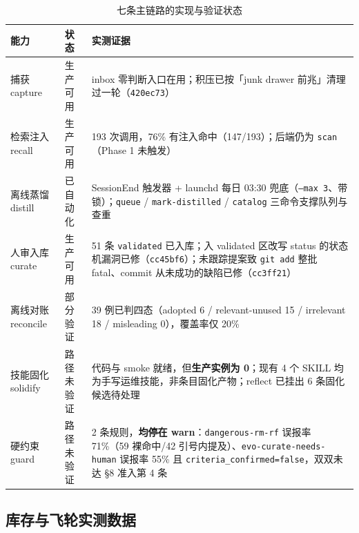 \documentclass[12pt,a4paper]{ctexart}
\begin{document}
\begin{table}[H]
\centering
\caption{七条主链路的实现与验证状态}
\begin{tabular}{@{}lp{2.4cm}p{6.4cm}@{}}
\toprule
\textbf{能力} & \textbf{状态} & \textbf{实测证据} \\
\midrule
捕获 capture & \textcolor{evogreen}{生产可用} & inbox 零判断入口在用；积压已按「junk drawer 前兆」清理过一轮（\texttt{420ec73}） \\
检索注入 recall & \textcolor{evogreen}{生产可用} & 193 次调用，76\% 有注入命中（147/193）；后端仍为 \texttt{scan}（Phase 1 未触发） \\
离线蒸馏 distill & \textcolor{evogreen}{已自动化} & SessionEnd 触发器 + launchd 每日 03:30 兜底（\texttt{--max 3}、带锁）；\texttt{queue} / \texttt{mark-distilled} / \texttt{catalog} 三命令支撑队列与查重 \\
人审入库 curate & \textcolor{evogreen}{生产可用} & 51 条 \texttt{validated} 已入库；入 validated 区改写 status 的状态机漏洞已修（\texttt{cc45bf6}）；未跟踪提案致 \texttt{git add} 整批 fatal、commit 从未成功的缺陷已修（\texttt{cc3ff21}） \\
离线对账 reconcile & \textcolor{evoyellow!70!black}{部分验证} & 39 例已判四态（adopted 6 / relevant-unused 15 / irrelevant 18 / misleading 0），覆盖率仅 20\% \\
技能固化 solidify & \textcolor{evored}{路径未验证} & 代码与 smoke 就绪，但\textbf{生产实例为 0}；现有 4 个 SKILL 均为手写运维技能，非条目固化产物；reflect 已挂出 6 条固化候选待处理 \\
硬约束 guard & \textcolor{evored}{路径未验证} & 2 条规则，\textbf{均停在 warn}：\texttt{dangerous-rm-rf} 误报率 71\%（59 裸命中/42 引号内提及）、\texttt{evo-curate-needs-human} 误报率 55\% 且 \texttt{criteria\_confirmed=false}，双双未达 §8 准入第 4 条 \\
\bottomrule
\end{tabular}
\end{table}

\subsection{库存与飞轮实测数据}
\end{document}
